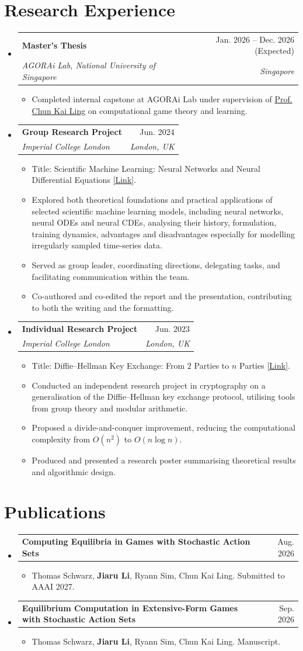 \documentclass[letterpaper,11pt]{article}
\makeatletter
\newcommand{\resumeItem}[1]{
  \item\small{
    {#1 \vspace{-2pt}}
  }
}
\newcommand{\resumeSubheading}[4]{
  \vspace{-2pt}\item
    \begin{tabular*}{0.97\textwidth}[t]{l@{\extracolsep{\fill}}r}
      \textbf{#1} & #2 \\
      \textit{\small#3} & \textit{\small #4} \\
    \end{tabular*}\vspace{-7pt}
}
\newcommand{\resumeProjectHeading}[2]{
    \item
    \begin{tabular*}{0.97\textwidth}{l@{\extracolsep{\fill}}r}
      \small#1 & #2 \\
    \end{tabular*}\vspace{-7pt}
}
\newcommand{\resumeSubHeadingListStart}{\begin{itemize}[leftmargin=0.15in, label={}]}
\newcommand{\resumeSubHeadingListEnd}{\end{itemize}}
\newcommand{\resumeItemListStart}{\begin{itemize}}
\newcommand{\resumeItemListEnd}{\end{itemize}\vspace{-5pt}}
\makeatother
\begin{document}
\section{Research Experience}
  \resumeSubHeadingListStart
    \resumeSubheading
      {Master's Thesis}{Jan. 2026 -- Dec. 2026 (Expected)}
      {AGORAi Lab, National University of Singapore}{Singapore}
      \resumeItemListStart
        \resumeItem{Completed internal capstone at AGORAi Lab under supervision of \href{https://lingchunkai.github.io}{Prof. Chun Kai Ling} on computational game theory and learning.}
      \resumeItemListEnd
    \resumeSubheading
      {Group Research Project}{Jun. 2024}
      {Imperial College London}{London, UK}
      \resumeItemListStart
        \resumeItem{Title: Scientific Machine Learning: Neural Networks and Neural Differential Equations [\href{https://github.com/jaamestaay/M2R-Group-29}{\underline{Link}}].}
        \resumeItem{Explored both theoretical foundations and practical applications of selected scientific machine learning models, including neural networks, neural ODEs and neural CDEs, analysing their history, formulation, training dynamics, advantages and disadvantages especially for modelling irregularly sampled time-series data.}
        \resumeItem{Served as group leader, coordinating directions, delegating tasks, and facilitating communication within the team.}
        \resumeItem{Co-authored and co-edited the report and the presentation, contributing to both the writing and the formatting.}
      \resumeItemListEnd
    \resumeSubheading
      {Individual Research Project}{Jun. 2023}
      {Imperial College London}{London, UK}
      \resumeItemListStart
        \resumeItem{Title: Diffie–Hellman Key Exchange: From $2$ Parties to $n$ Parties [\href{https://github.com/Opsimathy/Imperial/blob/main/Archive/M1R/Poster.pdf}{\underline{Link}}].}
        \resumeItem{Conducted an independent research project in cryptography on a generalisation of the Diffie–Hellman key exchange protocol, utilising tools from group theory and modular arithmetic.}
        \resumeItem{Proposed a divide-and-conquer improvement, reducing the computational complexity from $O(n^2)$ to $O(n\log n)$.}
        \resumeItem{Produced and presented a research poster summarising theoretical results and algorithmic design.}
    \resumeItemListEnd
  \resumeSubHeadingListEnd
\section{Publications}
  \resumeSubHeadingListStart
    \resumeProjectHeading
      {\textbf{Computing Equilibria in Games with Stochastic Action Sets}}{Aug. 2026}
      \resumeItemListStart
        \resumeItem{Thomas Schwarz, \textbf{Jiaru Li}, Ryann Sim, Chun Kai Ling. Submitted to AAAI 2027.}
      \resumeItemListEnd
    \resumeProjectHeading
      {\textbf{Equilibrium Computation in Extensive-Form Games with Stochastic Action Sets}}{Sep. 2026}
      \resumeItemListStart
        \resumeItem{Thomas Schwarz, \textbf{Jiaru Li}, Ryann Sim, Chun Kai Ling. Manuscript.}
      \resumeItemListEnd
  \resumeSubHeadingListEnd
\end{document}
